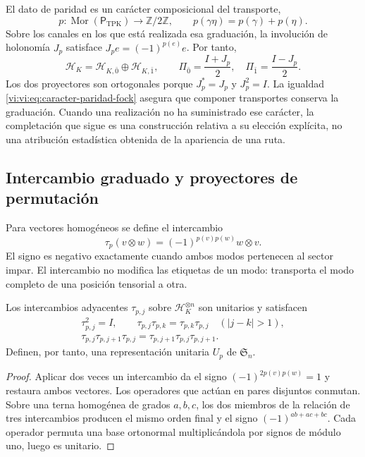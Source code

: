El dato de paridad es un carácter composicional del transporte,
\begin{equation}
 p:\operatorname{Mor}(\mathsf P_{\mathrm{TPK}})
 \longrightarrow\mathbb Z/2\mathbb Z,
 \qquad p(\gamma\eta)=p(\gamma)+p(\eta).
 \label{vi:vi:eq:caracter-paridad-fock}
\end{equation}
Sobre los canales en los que está realizada esa graduación, la
involución de holonomía \(J_p\) satisface
\(J_pe=(-1)^{p(e)}e\). Por tanto,
\[
 \mathcal H_K=\mathcal H_{K,\bar0}\oplus\mathcal H_{K,\bar1},
 \qquad \Pi_{\bar0}=\frac{I+J_p}{2},\quad
 \Pi_{\bar1}=\frac{I-J_p}{2}.
\]
Los dos proyectores son ortogonales porque \(J_p^*=J_p\) y
\(J_p^2=I\). La igualdad \eqref{vi:vi:eq:caracter-paridad-fock} asegura
que componer transportes conserva la graduación. Cuando una realización
no ha suministrado ese carácter, la completación que sigue es una
construcción relativa a su elección explícita, no una atribución
estadística obtenida de la apariencia de una ruta.

\subsection{Intercambio graduado y proyectores de permutación}
\label{vi:vi:subsec:intercambio-graduado}

Para vectores homogéneos se define el intercambio
\begin{equation}
 \tau_p(v\otimes w)=(-1)^{p(v)p(w)}w\otimes v.
 \label{vi:vi:eq:intercambio-graduado}
\end{equation}
El signo es negativo exactamente cuando ambos modos pertenecen al
sector impar. El intercambio no modifica las etiquetas de un modo:
transporta el modo completo de una posición tensorial a otra.

\begin{proposition}
\label{vi:vi:prop:permutaciones-graduadas}
Los intercambios adyacentes \(\tau_{p,j}\) sobre
\(\mathcal H_K^{\otimes n}\) son unitarios y satisfacen
\[
\begin{gathered}
 \tau_{p,j}^2=I,\qquad
 \tau_{p,j}\tau_{p,k}=\tau_{p,k}\tau_{p,j}\quad(|j-k|>1),\\
 \tau_{p,j}\tau_{p,j+1}\tau_{p,j}
 =\tau_{p,j+1}\tau_{p,j}\tau_{p,j+1}.
\end{gathered}
\]
Definen, por tanto, una representación unitaria \(U_p\) de
\(\mathfrak S_n\).
\end{proposition}
\begin{proof}
Aplicar dos veces un intercambio da el signo
\((-1)^{2p(v)p(w)}=1\) y restaura ambos vectores. Los operadores
que actúan en pares disjuntos conmutan. Sobre una terna homogénea
de grados \(a,b,c\), los dos miembros de la relación de tres
intercambios producen el mismo orden final y el signo
\((-1)^{ab+ac+bc}\). Cada operador permuta una base ortonormal
multiplicándola por signos de módulo uno, luego es unitario.
\end{proof}

